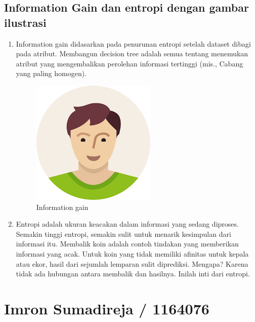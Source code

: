 \subsection{Information Gain dan entropi dengan gambar ilustrasi}
\begin{enumerate}
\item Information gain didasarkan pada penurunan entropi setelah dataset dibagi pada atribut. Membangun decision tree adalah semua tentang menemukan atribut yang mengembalikan perolehan informasi tertinggi (mis., Cabang yang paling homogen).
\begin{figure}[ht]
\centering
\includegraphics[scale=0.5]{figures/AFS/andri8.png}
\caption{Information gain}
\label{contoh}
\end{figure}
\item Entropi adalah ukuran keacakan dalam informasi yang sedang diproses. Semakin tinggi entropi, semakin sulit untuk menarik kesimpulan dari informasi itu. Membalik koin adalah contoh tindakan yang memberikan informasi yang acak. Untuk koin yang tidak memiliki afinitas untuk kepala atau ekor, hasil dari sejumlah lemparan sulit diprediksi. Mengapa? Karena tidak ada hubungan antara membalik dan hasilnya. Inilah inti dari entropi.
\end{enumerate}

\section{Imron Sumadireja / 1164076}
